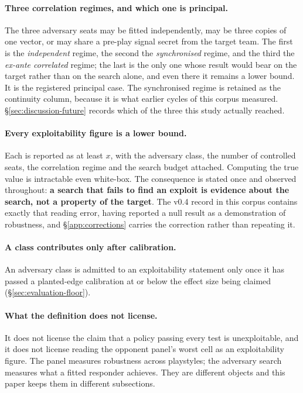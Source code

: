 \paragraph{Three correlation regimes, and which one is principal.} The three adversary seats may be
fitted independently, may be three copies of one vector, or may share a pre-play signal secret from
the target team. The first is the \emph{independent} regime, the second the \emph{synchronised}
regime, and the third the \emph{ex-ante correlated} regime; the last is the only one whose result
would bear on the target rather than on the search alone, and even there it remains a lower bound.
It is the registered principal case. The synchronised regime is
retained as the continuity column, because it is what earlier cycles of this corpus measured.
\S\ref{sec:discussion-future} records which of the three this study actually reached.

\paragraph{Every exploitability figure is a lower bound.} Each is reported as at least $x$, with the
adversary class, the number of controlled seats, the correlation regime and the search budget
attached. Computing the true value is intractable even white-box. The consequence is stated once and
observed throughout: \textbf{a search that fails to find an exploit is evidence about the search, not
a property of the target}. The v0.4 record in this corpus contains exactly that reading error, having
reported a null result as a demonstration of robustness, and \S\ref{app:corrections} carries the
correction rather than repeating it.

\paragraph{A class contributes only after calibration.} An adversary class is admitted to an
exploitability statement only once it has passed a planted-edge calibration at or below the effect
size being claimed (\S\ref{sec:evaluation-floor}).

\paragraph{What the definition does not license.} It does not license the claim that a policy passing
every test is unexploitable, and it does not license reading the opponent panel's worst cell as an
exploitability figure. The panel measures robustness across playstyles; the adversary search measures
what a fitted responder achieves. They are different objects and this paper keeps them in different
subsections.
